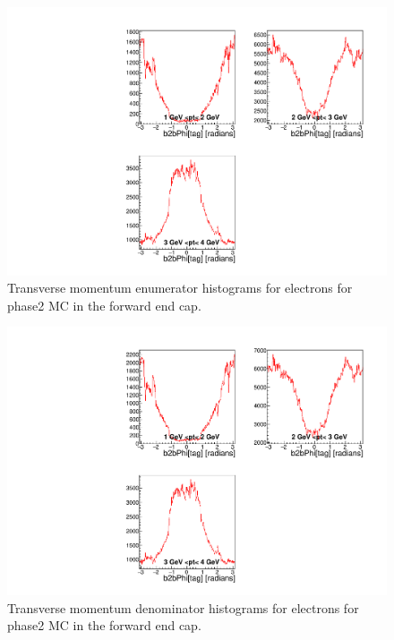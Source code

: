 \documentclass[a4paper,11pt,twosided,final,german,openbib,pdftex,listof=totoc,bibliography=totoc]{scrbook}
\begin{document}
\begin{appendix}
\begin{figure}[!htbp]
	\centering
	\includegraphics[width=\textwidth]{Plots/master/xPtMPhiemFCE_MC}
	\caption[Transverse Momentum $\phi$ Electron Forward End Cap Enumerator Histogram Phase2 MC]{Transverse momentum enumerator histograms for electrons for phase2 MC in the forward end cap.}
	\label{plt:PtMPhiemFCE_MC}
\end{figure}

\begin{figure}[!htbp]
	\centering
	\includegraphics[width=\textwidth]{Plots/master/xPtMPhiemFCD_MC}
	\caption[Transverse Momentum $\phi$ Electron Forward End Cap Denominator Histogram Phase2 MC]{Transverse momentum denominator histograms for electrons for phase2 MC in the forward end cap.}
	\label{plt:PtMPhiemFCD_MC}
\end{figure}



\end{appendix}
\end{document}
